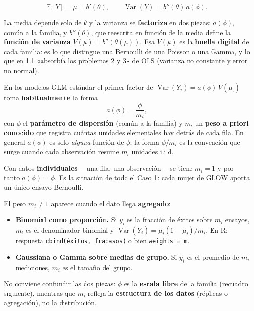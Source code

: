 \documentclass[
  letterpaper,
  DIV=11,
  numbers=noendperiod]{scrartcl}
\providecommand{\tightlist}{%
  \setlength{\itemsep}{0pt}\setlength{\parskip}{0pt}}\usepackage{longtable,booktabs,array}
\begin{document}
\[
\mathbb{E}[Y]=\mu=b'(\theta),\qquad
\operatorname{Var}(Y)=b''(\theta)\,a(\phi).
\]

La media depende solo de \(\theta\) y la varianza se \textbf{factoriza}
en dos piezas: \(a(\phi)\), común a la familia, y \(b''(\theta)\), que
reescrita en función de la media define la \textbf{función de varianza}
\(V(\mu)=b''(\theta(\mu))\). Esa \(V(\mu)\) es la \textbf{huella
digital} de cada familia: es lo que distingue una Bernoulli de una
Poisson o una Gamma, y lo que en 1.1 «absorbía los problemas 2 y 3» de
OLS (varianza no constante y error no normal).

\begin{tcolorbox}[enhanced jigsaw, breakable, colframe=quarto-callout-note-color-frame, left=2mm, arc=.35mm, colbacktitle=quarto-callout-note-color!10!white, toprule=.15mm, colback=white, coltitle=black, rightrule=.15mm, opacitybacktitle=0.6, title=\textcolor{quarto-callout-note-color}{\faInfo}\hspace{0.5em}{El otro factor de la varianza: \(a(\phi)\) y los pesos a priori}, titlerule=0mm, toptitle=1mm, bottomtitle=1mm, leftrule=.75mm, bottomrule=.15mm, opacityback=0]

En los modelos GLM estándar el primer factor de
\(\operatorname{Var}(Y_i)=a(\phi)\,V(\mu_i)\) toma
\textbf{habitualmente} la forma \[a(\phi)=\frac{\phi}{m_i},\] con
\(\phi\) el \textbf{parámetro de dispersión} (común a la familia) y
\(m_i\) un \textbf{peso a priori conocido} que registra cuántas unidades
elementales hay detrás de cada fila. En general \(a(\phi)\) es solo
\emph{alguna} función de \(\phi\); la forma \(\phi/m_i\) es la
convención que surge cuando cada observación resume \(m_i\) unidades
i.i.d.

Con datos \textbf{individuales} ---una fila, una observación--- se tiene
\(m_i=1\) y por tanto \(a(\phi)=\phi\). Es la situación de todo el Caso
1: cada mujer de GLOW aporta un único ensayo Bernoulli.

El peso \(m_i\neq1\) aparece cuando el dato llega \textbf{agregado}:

\begin{itemize}
\tightlist
\item
  \textbf{Binomial como proporción.} Si \(y_i\) es la fracción de éxitos
  sobre \(m_i\) ensayos, \(m_i\) es el denominador binomial y
  \(\operatorname{Var}(\bar Y_i)=\mu_i(1-\mu_i)/m_i\). En R: respuesta
  \texttt{cbind(éxitos,\ fracasos)} o bien \texttt{weights\ =\ m}.
\item
  \textbf{Gaussiana o Gamma sobre medias de grupo.} Si \(y_i\) es el
  promedio de \(m_i\) mediciones, \(m_i\) es el tamaño del grupo.
\end{itemize}

No conviene confundir las dos piezas: \(\phi\) es la \textbf{escala
libre} de la familia (recuadro siguiente), mientras que \(m_i\) refleja
la \textbf{estructura de los datos} (réplicas o agregación), no la
distribución.

\end{tcolorbox}
\end{document}
